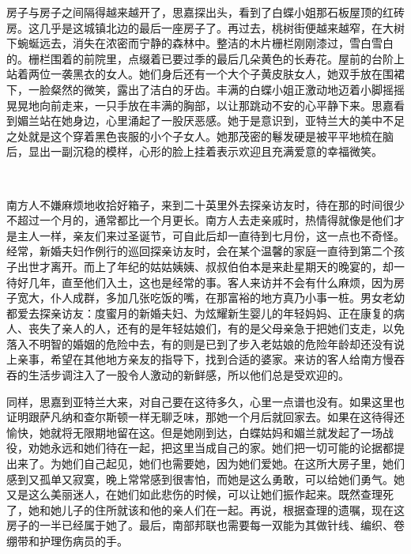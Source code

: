 \par 房子与房子之间隔得越来越开了，思嘉探出头，看到了白蝶小姐那石板屋顶的红砖房。这几乎是这城镇北边的最后一座房子了。再过去，桃树街便越来越窄，在大树下蜿蜒远去，消失在浓密而宁静的森林中。整洁的木片栅栏刚刚漆过，雪白雪白的。栅栏围着的前院里，点缀着已要过季的最后几朵黄色的长寿花。屋前的台阶上站着两位一袭黑衣的女人。她们身后还有一个大个子黄皮肤女人，她双手放在围裙下，一脸粲然的微笑，露出了洁白的牙齿。丰满的白蝶小姐正激动地迈着小脚摇摇晃晃地向前走来，一只手放在丰满的胸部，以让那跳动不安的心平静下来。思嘉看到媚兰站在她身边，心里涌起了一股厌恶感。她于是意识到，亚特兰大的美中不足之处就是这个穿着黑色丧服的小个子女人。她那茂密的鬈发硬是被平平地梳在脑后，显出一副沉稳的模样，心形的脸上挂着表示欢迎且充满爱意的幸福微笑。
\par  
\par 南方人不嫌麻烦地收拾好箱子，来到二十英里外去探亲访友时，待在那的时间很少不超过一个月的，通常都比一个月更长。南方人去走亲戚时，热情得就像是他们才是主人一样，亲友们来过圣诞节，可自此后却一直待到七月份，这一点也不奇怪。经常，新婚夫妇作例行的巡回探亲访友时，会在某个温馨的家庭一直待到第二个孩子出世才离开。而上了年纪的姑姑姨姨、叔叔伯伯本是来赴星期天的晚宴的，却一待好几年，直至他们入土，这也是经常的事。客人来访并不会有什么麻烦，因为房子宽大，仆人成群，多加几张吃饭的嘴，在那富裕的地方真乃小事一桩。男女老幼都爱去探亲访友：度蜜月的新婚夫妇、为炫耀新生婴儿的年轻妈妈、正在康复的病人、丧失了亲人的人，还有的是年轻姑娘们，有的是父母亲急于把她们支走，以免落入不明智的婚姻的危险中去，有的则是已到了步入老姑娘的危险年龄却还没有说上亲事，希望在其他地方亲友的指导下，找到合适的婆家。来访的客人给南方慢吞吞的生活步调注入了一股令人激动的新鲜感，所以他们总是受欢迎的。
\par 同样，思嘉到亚特兰大来，对自己要在这待多久，心里一点谱也没有。如果这里也证明跟萨凡纳和查尔斯顿一样无聊乏味，那她一个月后就回家去。如果在这待得还愉快，她就将无限期地留在这。但是她刚到达，白蝶姑妈和媚兰就发起了一场战役，劝她永远和她们待在一起，把这里当成自己的家。她们把一切可能的论据都提出来了。为她们自己起见，她们也需要她，因为她们爱她。在这所大房子里，她们感到又孤单又寂寞，晚上常常感到很害怕，而她是这么勇敢，可以给她们勇气。她又是这么美丽迷人，在她们如此悲伤的时候，可以让她们振作起来。既然查理死了，她和她儿子的住所就该和他的亲人们在一起。再说，根据查理的遗嘱，现在这房子的一半已经属于她了。最后，南部邦联也需要每一双能为其做针线、编织、卷绷带和护理伤病员的手。
